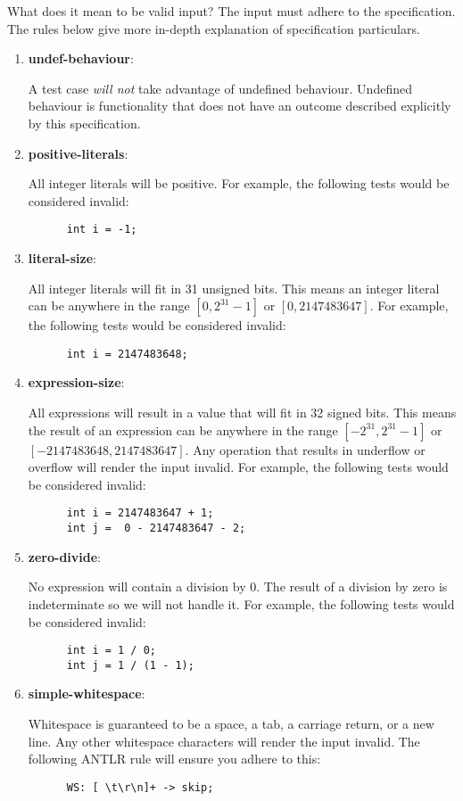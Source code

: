 \documentclass{article}
\newcommand{\assertiondest}[1]{\hypertarget{#1}{\textbf{#1}:}}
\begin{document}
What does it mean to be valid input? The input must adhere to the specification. The rules below
give more in-depth explanation of specification particulars.
\begin{enumerate}
  \item
    \assertiondest{undef-behaviour}
    A test case \textit{will not} take advantage of undefined behaviour. Undefined behaviour is
    functionality that does not have an outcome described explicitly by this specification.
  \item
    \assertiondest{positive-literals}
    All integer literals will be positive. For example, the following tests would be considered
    invalid:
    \begin{lstlisting}
      int i = -1;
    \end{lstlisting}
  \item
    \assertiondest{literal-size}
    All integer literals will fit in 31 unsigned bits. This means an integer literal can be
    anywhere in the range $[0, 2^{31} - 1]$ or $[0, 2147483647]$. For example, the following tests
    would be considered invalid:
    \begin{lstlisting}
      int i = 2147483648;
    \end{lstlisting}
  \item
    \assertiondest{expression-size}
    All expressions will result in a value that will fit in 32 signed bits. This means the result
    of an expression can be anywhere in the range $[-2^{31}, 2^{31} - 1]$ or $[-2147483648,
    2147483647]$. Any operation that results in underflow or overflow will render the input
    invalid. For example, the following tests would be considered invalid:
    \begin{lstlisting}
      int i = 2147483647 + 1;
      int j =  0 - 2147483647 - 2;
    \end{lstlisting}
  \item
    \assertiondest{zero-divide}
    No expression will contain a division by 0. The result of a division by zero is indeterminate
    so we will not handle it. For example, the following tests would be considered invalid:
    \begin{lstlisting}
      int i = 1 / 0;
      int j = 1 / (1 - 1);
    \end{lstlisting}
  \item
    \assertiondest{simple-whitespace}
    Whitespace is guaranteed to be a space, a tab, a carriage return, or a new
    line. Any other whitespace characters will render the input invalid. The following ANTLR rule
    will ensure you adhere to this:
    \begin{lstlisting}
      WS: [ \t\r\n]+ -> skip;
    \end{lstlisting}
\end{enumerate}
\end{document}
